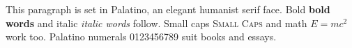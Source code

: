 \documentclass{article}
\begin{document}
This paragraph is set in Palatino, an elegant humanist serif face.
Bold \textbf{bold words} and italic \textit{italic words} follow.
Small caps \textsc{Small Caps} and math $E = mc^2$ work too.
Palatino numerals 0123456789 suit books and essays.
\end{document}
